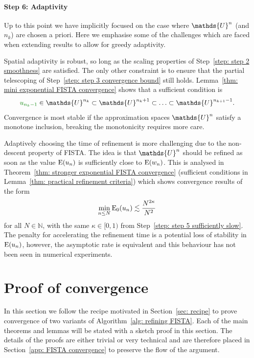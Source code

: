 \documentclass[smallextended]{svjour3}
\let\F\mathds\let\C\mathcal\newcommand{\R}{\F{R}}\newcommand{\A}{\tens{A}}
\newcommand{\op}[1]{\operatorname{#1}}
\newcommand{\1}{\F{1}}
\newcounter{adaptStepCounter}
\newenvironment{adaptiveStep}{\refstepcounter{adaptStepCounter}}{}
\newcommand*{\varf}[1]{%
	\IfEqCase{#1}{%
		{0}{u}%
		{1}{v}%
		{2}{w}%
	}[u#1]%
}
\newcommand*{\spcf}[1]{%
	\IfEqCase{#1}{%
		{0}{\F{U}}%
		{1}{\F{V}}%
		{2}{\F{W}}%
	}[\F{U}#1]%
}
\newcommand{\edit}[2]{{\ifmmode\text{\color{red}\sout{\ensuremath{#1}}}\else {\color{red} \sout{#1}}\fi} {\color{darkgreen} #2}}
\begin{document}
	\paragraph{Step 6: Adaptivity}
	\begin{adaptiveStep}\label{step: step 6 adaptivity}
		Up to this point we have implicitly focused on the case where $\spcf0^n$ (and $n_k$) are chosen a priori. Here we emphasise some of the challenges which are faced when extending results to allow for greedy adaptivity.
		
		Spatial adaptivity is robust, so long as the scaling properties of Step~\ref{step: step 2 smoothness} are satisfied. The only other constraint is to ensure that the partial telescoping of Step~\ref{step: step 3 convergence bound} still holds. Lemma~\ref{thm: mini exponential FISTA convergence} shows that a sufficient condition is
		$$\edit{}{\varf0_{n_k-1}}\in\spcf0^{n_k}\subset\spcf0^{n_k+1}\subset\ldots\subset\spcf0^{n_{k+1}-1}.$$
		Convergence is most stable if the approximation spaces $\spcf0^n$ satisfy a monotone inclusion, breaking the monotonicity requires more care.
		
		Adaptively choosing the time of refinement is more challenging due to the non-descent property of FISTA. The idea is that $\spcf0^n$ should be refined as soon as the value $\op{E}(\varf0_n)$ is sufficiently close to $\op{E}(\varf2_n)$. This is analysed in Theorem~\ref{thm: stronger exponential FISTA convergence} (sufficient conditions in Lemma~\ref{thm: practical refinement criteria}) which shows convergence results of the form
		$$ \min_{n\leq N}\op{E}_0(\varf0_n) \lesssim \frac{N^{2\kappa}}{N^2}$$
		for all $N\in\F N$, with the same $\kappa\in[0,1)$ from Step~\ref{step: step 5 sufficiently slow}. The penalty for accelerating the refinement time is a potential loss of stability in $\op{E}(\varf0_n)$, however, the asymptotic rate is equivalent and this behaviour has not been seen in numerical experiments.
	\end{adaptiveStep}
	
	\section{Proof of convergence}\label{sec: FISTA convergence}
	In this section we follow the recipe motivated in Section~\ref{sec: recipe} to prove convergence of two variants of Algorithm~\ref{alg: refining FISTA}. Each of the main theorems and lemmas will be stated with a sketch proof in this section. The details of the proofs are either trivial or very technical and are therefore placed in Section~\ref{app: FISTA convergence} to preserve the flow of the argument.
	
\end{document}
